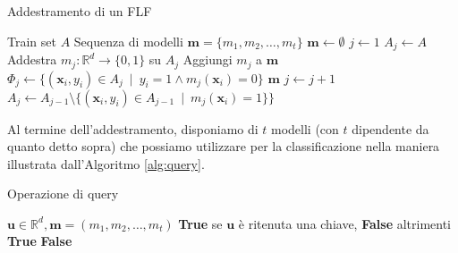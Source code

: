 \begin{algorithm}[ht]
\caption{Addestramento di un FLF}
    \begin{algorithmic}[1]
    \Require Train set $A$
    \Ensure Sequenza di modelli $\mathbf{m} = \{m_1, m_2, \dots, m_t \}$
    \State $\mathbf{m} \gets \emptyset$
    \State $j \gets 1$
    \State $A_j \gets A$
        \State Addestra $m_j : \mathbb{R}^d \rightarrow \{0,1 \}$ su $A_j$
        \State Aggiungi $m_j$ a $\mathbf{m}$
        \State $\Phi_j \gets \{ (\mathbf{x}_i, y_i) \in A_j \enspace | \enspace y_i = 1 \wedge m_j(\mathbf{x}_i)=0 \}$ 
            \State \Return $\mathbf{m}$
        \Else
            \State $j \gets j+1$
            \State $A_j \gets A_{j-1} \setminus \{ (\mathbf{x}_i, y_i) \in A_{j-1} \enspace | \enspace m_j(\mathbf{x}_i)=1 \} \}$
        \EndIf
    \EndWhile
    \end{algorithmic}
    \label{alg:addestramento-catena}
\end{algorithm}

Al termine dell'addestramento, disponiamo di $t$ modelli (con $t$ dipendente da quanto detto sopra) che possiamo utilizzare per la classificazione nella maniera illustrata dall'Algoritmo \ref{alg:query}. 

\begin{algorithm}[ht]
\caption{Operazione di query}
    \begin{algorithmic}[1]
        \Require $\mathbf{u} \in \mathbb{R}^d, \mathbf{m} = (m_1, m_2, \dots, m_t)$
        \Ensure \textbf{True} se $\mathbf{u}$ è ritenuta una chiave, \textbf{False} altrimenti
                \State \Return \textbf{True}
            \EndIf
        \EndFor
        \State \Return \textbf{False}
    \end{algorithmic}
    \label{alg:query}
\end{algorithm}

